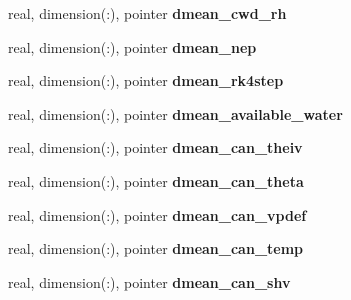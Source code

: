 \begin{DoxyCompactItemize}
\item 
\hypertarget{structed__state__vars_1_1sitetype_a731337283a3521377ae17e40039b18ca}{
real, dimension(:), pointer {\bfseries dmean\_\-cwd\_\-rh}}
\label{structed__state__vars_1_1sitetype_a731337283a3521377ae17e40039b18ca}

\item 
\hypertarget{structed__state__vars_1_1sitetype_aaa6b0f9e3e634866de1e32cebfbaddd5}{
real, dimension(:), pointer {\bfseries dmean\_\-nep}}
\label{structed__state__vars_1_1sitetype_aaa6b0f9e3e634866de1e32cebfbaddd5}

\item 
\hypertarget{structed__state__vars_1_1sitetype_a9af9cb188d221beafe36a780aa83eb59}{
real, dimension(:), pointer {\bfseries dmean\_\-rk4step}}
\label{structed__state__vars_1_1sitetype_a9af9cb188d221beafe36a780aa83eb59}

\item 
\hypertarget{structed__state__vars_1_1sitetype_a7b8faf6d96cde23b9fa732555460cd6b}{
real, dimension(:), pointer {\bfseries dmean\_\-available\_\-water}}
\label{structed__state__vars_1_1sitetype_a7b8faf6d96cde23b9fa732555460cd6b}

\item 
\hypertarget{structed__state__vars_1_1sitetype_a3652e0a5c079f90d9320b289f3edf05f}{
real, dimension(:), pointer {\bfseries dmean\_\-can\_\-theiv}}
\label{structed__state__vars_1_1sitetype_a3652e0a5c079f90d9320b289f3edf05f}

\item 
\hypertarget{structed__state__vars_1_1sitetype_a385fdf989d1d0a54bf0ffd4629f7d5b3}{
real, dimension(:), pointer {\bfseries dmean\_\-can\_\-theta}}
\label{structed__state__vars_1_1sitetype_a385fdf989d1d0a54bf0ffd4629f7d5b3}

\item 
\hypertarget{structed__state__vars_1_1sitetype_ad993e0ecfac734892e42b9b89a177a82}{
real, dimension(:), pointer {\bfseries dmean\_\-can\_\-vpdef}}
\label{structed__state__vars_1_1sitetype_ad993e0ecfac734892e42b9b89a177a82}

\item 
\hypertarget{structed__state__vars_1_1sitetype_a5e42c6dffba06bbca2ebf9f34bb2a91c}{
real, dimension(:), pointer {\bfseries dmean\_\-can\_\-temp}}
\label{structed__state__vars_1_1sitetype_a5e42c6dffba06bbca2ebf9f34bb2a91c}

\item 
\hypertarget{structed__state__vars_1_1sitetype_afe3b846f3e4f0d86010e0d8ce6552470}{
real, dimension(:), pointer {\bfseries dmean\_\-can\_\-shv}}
\label{structed__state__vars_1_1sitetype_afe3b846f3e4f0d86010e0d8ce6552470}


\end{DoxyCompactItemize}
